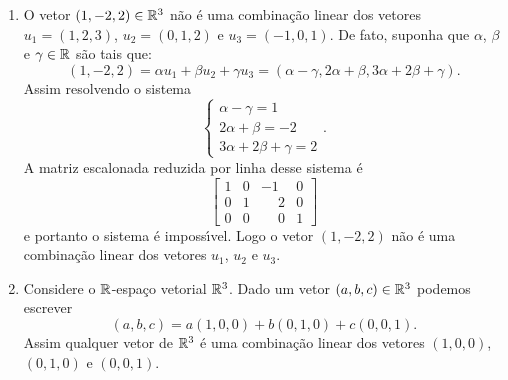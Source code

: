 \begin{exemplo}
\begin{enumerate}[label={\arabic*})]
    \item O vetor $(1, -2, 2) \in \mathbb{R}^3$ n\~ao \'e uma combina\c{c}\~ao linear dos vetores $u_1 = (1, 2, 3)$, $u_2 = (0, 1, 2)$ e $u_3 = (-1, 0, 1)$. De fato, suponha que $\alpha$, $\beta$ e $\gamma \in \mathbb{R}$ s\~ao tais que:
          \[
            (1, -2, 2) = \alpha u_1 + \beta u_2 + \gamma u_3 = (\alpha - \gamma, 2\alpha + \beta, 3\alpha + 2\beta + \gamma).
          \]
          Assim resolvendo o sistema
          \[
            \begin{cases}
              \alpha - \gamma = 1  \\
              2\alpha + \beta = -2 \\
              3\alpha + 2\beta + \gamma = 2
            \end{cases}.
          \]
          A matriz escalonada reduzida por linha desse sistema \'e
          \[
            \begin{bmatrix}
              1 & 0 & -1           & 0 \\
              0 & 1 & \phantom{-}2 & 0 \\
              0 & 0 & \phantom{-}0 & 1
            \end{bmatrix}
          \]
          e portanto o sistema \'e imposs{\'\i}vel. Logo o vetor $(1, -2, 2)$ n\~ao \'e uma combina\c{c}\~ao linear dos vetores $u_1$, $u_2$ e $u_3$.

    \item Considere o $\mathbb{R}$-espa\c{c}o vetorial $\mathbb{R}^3$. Dado um vetor $(a, b, c) \in \mathbb{R}^3$ podemos escrever
          \[
            (a, b, c) = a(1, 0, 0) + b(0, 1, 0) + c(0, 0, 1).
          \]
          Assim qualquer vetor de $\mathbb{R}^3$ \'e uma combina\c{c}\~ao linear dos vetores $(1, 0 , 0)$, $(0, 1 , 0)$ e $(0, 0 , 1)$.


\end{enumerate}
\end{exemplo}
